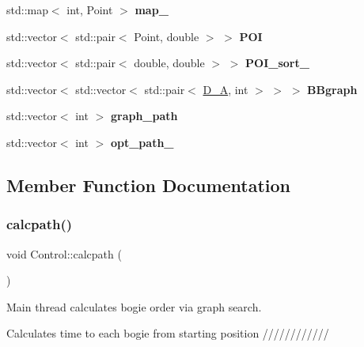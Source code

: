 \begin{DoxyCompactItemize}
\mbox{\label{classControl_a3e85346d55044ad264e2806f4d50f75d}} 
std\+::map$<$ int, Point $>$ {\bfseries map\+\_\+}
\item 
\mbox{\label{classControl_a8b9b711bca4a1d3d796c4943141b2d46}} 
std\+::vector$<$ std\+::pair$<$ Point, double $>$ $>$ {\bfseries P\+OI}
\item 
\mbox{\label{classControl_a4f42fcf3ec3958ee4fd8cedfd34ed3c4}} 
std\+::vector$<$ std\+::pair$<$ double, double $>$ $>$ {\bfseries P\+O\+I\+\_\+sort\+\_\+}
\item 
\mbox{\label{classControl_a306e59dd2abffd5dc259e49cd0d11250}} 
std\+::vector$<$ std\+::vector$<$ std\+::pair$<$ \hyperlink{structD__A}{D\+\_\+A}, int $>$ $>$ $>$ {\bfseries B\+Bgraph}
\item 
\mbox{\label{classControl_a9fffc0076b66e557907e84e429c8e859}} 
std\+::vector$<$ int $>$ {\bfseries graph\+\_\+path}
\item 
\mbox{\label{classControl_a9f281d802d134300f3583f5d14388eb9}} 
std\+::vector$<$ int $>$ {\bfseries opt\+\_\+path\+\_\+}
\end{DoxyCompactItemize}


\subsection{Member Function Documentation}
\mbox{\label{classControl_a9bfe498567206c176b0e23d71708d6e3}} 
\subsubsection{\texorpdfstring{calcpath()}{calcpath()}}
{\footnotesize\ttfamily void Control\+::calcpath (\begin{DoxyParamCaption}{ }\end{DoxyParamCaption})\hspace{0.3cm}{\ttfamily [protected]}}



Main thread calculates bogie order via graph search. 

Calculates time to each bogie from starting position //////////// \mbox{\label{classControl_aa18094ca515f8dbcdff94e0b7a60a88a}} 
